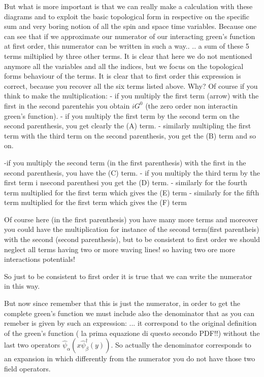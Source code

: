 \documentclass[../main/main.tex]{subfiles}
\begin{document}
But what is more important is that we can really make a calculation with these diagrams and to exploit the basic topological form in respective on the specific sum and very boring notion of all the spin and space time variables. Because one can see that if we approximate our numerator of our interacting green's function at first order, this numerator can be written in such a way..
..
a sum of these 5 terms miltiplied by three other terms. It is clear that here we do not mentioned anymore all the variables and all the indices, but we focus on the topological forms behaviour of the terms. It is clear that to first order this expression is correct, because you recover all the six terms listed above. Why? Of course if you think to make the multiplication:
- if you multiply the first term (arrow) with the first in the second parentehis you obtain \( i G^0 \) (the zero order non interactin green's function).
- if you multiply the first term by the second term on the second parenthesis, you get clearly the (A) term.
- similarly multipling the first term with the third term on the second parenthesis, you get the (B) term and so on.

-if you multiply the second term (in the first parenthesis) with the first in the second parenthesis, you have the (C) term.
- if you multiply the third term by the first term i nsecond parenthesi you get the (D) term.
- similarly for the fourth term multiplied for the first term which gives the (E) term
- similarly for the fifth term multiplied for the first term which gives the (F) term

Of course here (in the first parenthesis) you have many more terms and moreover you could have the multiplication for instance of the second term(first parentheis) with the second (second parenthesis), but to be consistent to first order we should neglect all terms having two or more waving lines! so having two ore more interactions potentials!

So just to be consistent to first order it is true that we can write the numerator in this way.




But now since remember that this is just the numerator, in order to get the complete green's function we must include also the denominator that as you can remeber is given by such an expression:
...
it correspond to the original definition of the green's function ( la prima equazione di questo secondo PDF!!) without  the last two operators \( \hat{\psi }_ \alpha (x \hat{\psi }_ \beta ^\dag (y) )  \).
So actually the denominator corresponds to an expansion in which differently from the numerator you do not have those two field operators.
\end{document}
